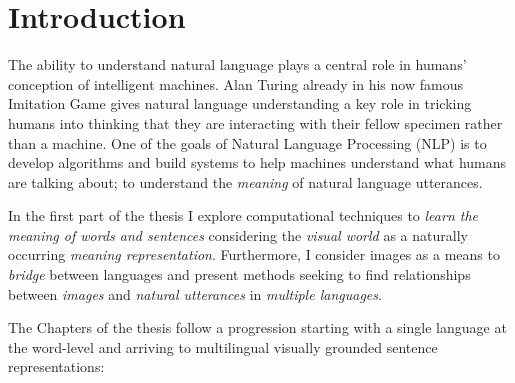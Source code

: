 

\chapter{Introduction}
\label{ch:introduction}

The ability to understand natural language plays a central role in humans' conception of intelligent machines.
Alan Turing already in his now famous Imitation Game \citep{machinery1950computing} 
gives natural language understanding a
key role in tricking humans into thinking that they are interacting with their fellow specimen rather
than a machine. One of the goals of Natural Language Processing (NLP) is to develop algorithms
and build systems to help machines understand what humans are talking about; to
understand the \emph{meaning} of natural language utterances.

In the first part of the thesis I explore computational techniques to
\emph{learn the meaning of words and  sentences} 
considering the \emph{visual world} as a naturally occurring
\emph{meaning representation}. Furthermore, I consider images
as a means to \emph{bridge} between languages and 
present methods seeking to find relationships between \emph{images} and
\emph{natural utterances} in \emph{multiple languages}.


The  Chapters of the thesis follow a progression
starting with a single language at the word-level and arriving to multilingual visually grounded sentence
representations:

